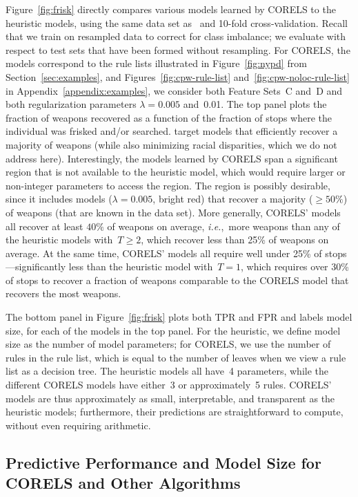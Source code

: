 \documentclass[twoside,11pt]{article}
\def\ie{{\it i.e.},~}
\def\Reg{{\lambda}}
\begin{document}
Figure~\ref{fig:frisk} directly compares various models learned by CORELS to the heuristic models,
using the same data set as~\citet{Goel16} and 10-fold cross-validation.
%
Recall that we train on resampled data to correct for class imbalance;
we evaluate with respect to test sets that have been formed without resampling.
%
For CORELS, the models correspond to the rule lists illustrated in Figure~\ref{fig:nypd}
from Section~\ref{sec:examples}, and Figures~\ref{fig:cpw-rule-list} and~\ref{fig:cpw-noloc-rule-list}
in Appendix~\ref{appendix:examples}, we consider both Feature Sets~C and~D
and both regularization parameters ${\Reg = 0.005}$ and~0.01.
%
The top panel plots the fraction of weapons recovered as a function of the fraction of
stops where the individual was frisked and/or searched.
%
\citet{Goel16} target models that efficiently recover a majority of weapons
(while also minimizing racial disparities, which we do not address here).
%
Interestingly, the models learned by CORELS span a significant region that is not available
to the heuristic model, which would require larger or non-integer parameters to access the region.
%
The region is possibly desirable, since it includes models (${\Reg = 0.005}$, bright red)
that recover a majority (${\ge 50\%}$) of weapons (that are known in the data set).
%
More generally, CORELS' models all recover at least ${40\%}$ of weapons
on average, \ie more weapons than any of the heuristic models with~${T \ge 2}$,
which recover less than 25\% of weapons on average.
%
At the same time, CORELS' models all require well under 25\% of stops---significantly
less than the heuristic model with~${T = 1}$, which requires over 30\% of stops
to recover a fraction of weapons comparable to the CORELS model that recovers the most weapons.

The bottom panel in Figure~\ref{fig:frisk} plots both TPR and FPR and labels model size,
for each of the models in the top panel.
%
For the heuristic, we define model size as the number of model parameters;
for CORELS, we use the number of rules in the rule list,
which is equal to the number of leaves when we view a rule list as a decision tree.
%
The heuristic models all have~4 parameters, while the different CORELS models have
either~3 or approximately~5 rules.
%
CORELS' models are thus approximately as small, interpretable, and transparent
as the heuristic models; furthermore, their predictions are straightforward
to compute, without even requiring arithmetic.

\subsection{Predictive Performance and Model Size for CORELS and Other Algorithms}
\label{sec:sparsity}
\end{document}
